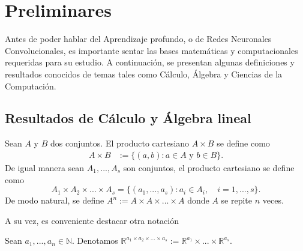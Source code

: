     \chapter{Preliminares}
    Antes de poder hablar del Aprendizaje profundo, o de Redes Neuronales Convolucionales, es importante sentar las bases matemáticas y computacionales requeridas para su estudio. A continuación, se presentan algunas definiciones y resultados conocidos de temas tales como Cálculo, Álgebra y Ciencias de la Computación.
    \section{Resultados de Cálculo y Álgebra lineal}
    \begin{definition}
        Sean $A$ y $B$ dos conjuntos. El producto cartesiano $A \times B$ se define como
        \begin{eqnarray}
            A \times B &:= \{(a,b) : a\in A \text{ y } b\in B\}.
        \end{eqnarray}
        De igual manera sean $A_1, ..., A_s$ son conjuntos, el producto cartesiano se define como
        \begin{equation}
            A_1\times A_2 \times ... \times A_s = \{(a_1,..., a_s): a_i\in A_i, \quad i= 1,...,s\}.
        \end{equation}
        De modo natural, se define $A^n :=  A \times A \times ... \times A$ donde $A$ se repite $n$ veces.
    \end{definition}
    A su vez, es conveniente destacar otra notación
    
    \begin{notation}
        Sean $a_1, ..., a_n\in \mathbb N$. Denotamos $\mathbb R^{a_1 \times a_2 \times ... \times a_s} := \mathbb R^{a_1} \times ... \times \mathbb R^{a_s}$.
    \end{notation}

